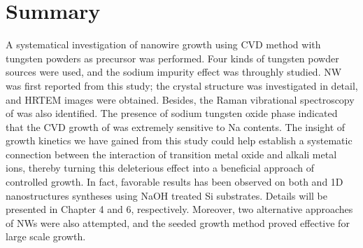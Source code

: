 
\section{Summary}

A systematical investigation of  nanowire growth using CVD method with tungsten powders as precursor was performed. Four kinds of tungsten powder sources were used, and the sodium impurity effect was throughly studied.  NW was first reported from this study; the crystal structure was investigated in detail, and HRTEM images were obtained. Besides, the Raman vibrational spectroscopy of  was also identified. The presence of sodium tungsten oxide phase indicated that the CVD growth of  was extremely sensitive to Na contents. The insight of  growth kinetics we have gained from this study could help establish a systematic connection between the interaction of transition metal oxide and alkali metal ions, thereby turning this deleterious effect into a beneficial approach of controlled growth. In fact, favorable results has been observed on both  and  1D nanostructures syntheses using NaOH treated Si substrates. Details will be presented in Chapter 4 and 6, respectively. Moreover, two alternative approaches of  NWs were also attempted, and the seeded growth method proved effective for large scale growth. 



